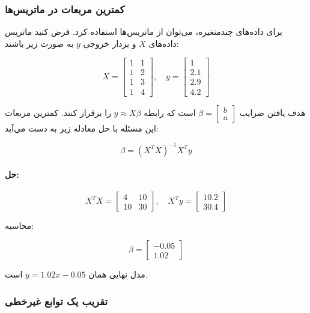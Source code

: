 \subsubsection{ کمترین مربعات در ماتریس‌ها}
\begin{example}
	
	برای داده‌های چندمتغیره، می‌توان از ماتریس‌ها استفاده کرد. فرض کنید ماتریس داده‌های \(X\) و بردار خروجی \(y\) به صورت زیر باشند:
	
	\[
	X = \begin{bmatrix}
		1 & 1 \\
		1 & 2 \\
		1 & 3 \\
		1 & 4
	\end{bmatrix}, \quad
	y = \begin{bmatrix}
		1 \\
		2.1 \\
		2.9 \\
		4.2
	\end{bmatrix}
	\]
	
	هدف یافتن ضرایب \( \beta = \begin{bmatrix} b \\ a \end{bmatrix} \) است که رابطه \(y \approx X \beta\) را برقرار کنند. کمترین مربعات این مسئله با حل معادله زیر به دست می‌آید:
	
	\[
	\beta = (X^T X)^{-1} X^T y
	\]
	
	\paragraph{حل:}
	
	\[
	X^T X = \begin{bmatrix}
		4 & 10 \\
		10 & 30
	\end{bmatrix}, \quad
	X^T y = \begin{bmatrix}
		10.2 \\
		30.4
	\end{bmatrix}
	\]
	
	محاسبه:
	
	\[
	\beta = \begin{bmatrix}
		-0.05 \\
		1.02
	\end{bmatrix}
	\]
	
	مدل نهایی همان \(y = 1.02x - 0.05\) است.
\end{example}
\subsubsection{تقریب یک توابع غیرخطی}

